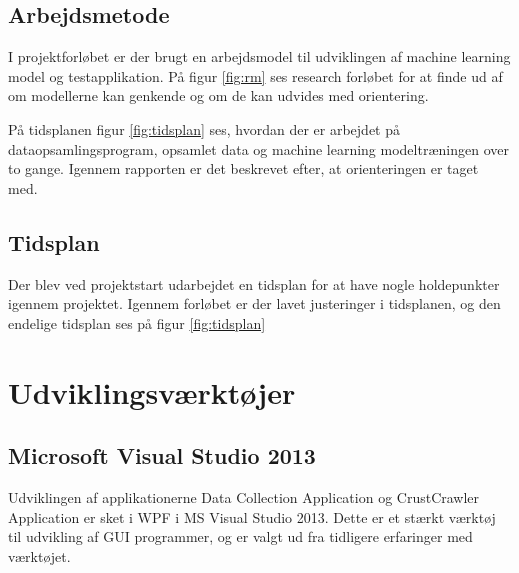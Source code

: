 \subsection{Arbejdsmetode}
I projektforløbet er der brugt en arbejdsmodel til udviklingen af machine learning model og testapplikation. På figur \ref{fig:rm} ses research forløbet for at finde ud af om modellerne kan genkende og om de kan udvides med orientering.


På tidsplanen figur \ref{fig:tidsplan} ses, hvordan der er arbejdet på dataopsamlingsprogram, opsamlet data og machine learning modeltræningen over to gange. Igennem rapporten er det beskrevet efter, at orienteringen er taget med.


\subsection{Tidsplan}
\label{sec:tidsplan}
Der blev ved projektstart udarbejdet en tidsplan for at have nogle holdepunkter igennem projektet. Igennem forløbet er der lavet justeringer i tidsplanen, og den endelige tidsplan ses på figur \ref{fig:tidsplan}


\section{Udviklingsværktøjer}
\label{sec:Udviklingsvaerktojer}

\subsection*{Microsoft Visual Studio 2013}
Udviklingen af applikationerne Data Collection Application og CrustCrawler Application er sket i WPF i MS Visual Studio 2013. Dette er et stærkt værktøj til udvikling af GUI programmer, og er valgt ud fra tidligere erfaringer med værktøjet.

